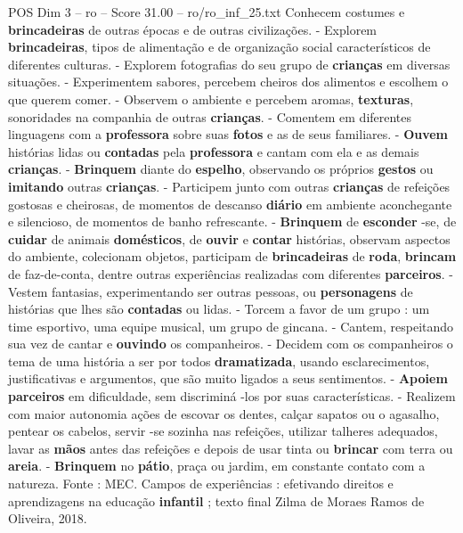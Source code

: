 \begin{textsample}{POS Dim 3 – ro – Score 31.00 – ro/ro\_inf\_25.txt}
Conhecem costumes e \textbf{brincadeiras} de outras épocas e de outras civilizações. - Explorem \textbf{brincadeiras}, tipos de alimentação e de organização social característicos de diferentes culturas. - Explorem fotografias do seu grupo de \textbf{crianças} em diversas situações. - Experimentem sabores, percebem cheiros dos alimentos e escolhem o que querem comer. - Observem o ambiente e percebem aromas, \textbf{texturas}, sonoridades na companhia de outras \textbf{crianças}. - Comentem em diferentes linguagens com a \textbf{professora} sobre suas \textbf{fotos} e as de seus familiares. - \textbf{Ouvem} histórias lidas ou \textbf{contadas} pela \textbf{professora} e cantam com ela e as demais \textbf{crianças}. - \textbf{Brinquem} diante do \textbf{espelho}, observando os próprios \textbf{gestos} ou \textbf{imitando} outras \textbf{crianças}. - Participem junto com outras \textbf{crianças} de refeições gostosas e cheirosas, de momentos de descanso \textbf{diário} em ambiente aconchegante e silencioso, de momentos de banho refrescante. - \textbf{Brinquem} de \textbf{esconder} -se, de \textbf{cuidar} de animais \textbf{domésticos}, de \textbf{ouvir} e \textbf{contar} histórias, observam aspectos do ambiente, colecionam objetos, participam de \textbf{brincadeiras} de \textbf{roda}, \textbf{brincam} de faz-de-conta, dentre outras experiências realizadas com diferentes \textbf{parceiros}. - Vestem fantasias, experimentando ser outras pessoas, ou \textbf{personagens} de histórias que lhes são \textbf{contadas} ou lidas. - Torcem a favor de um grupo : um time esportivo, uma equipe musical, um grupo de gincana. - Cantem, respeitando sua vez de cantar e \textbf{ouvindo} os companheiros. - Decidem com os companheiros o tema de uma história a ser por todos \textbf{dramatizada}, usando esclarecimentos, justificativas e argumentos, que são muito ligados a seus sentimentos. - \textbf{Apoiem} \textbf{parceiros} em dificuldade, sem discriminá -los por suas características. - Realizem com maior autonomia ações de escovar os dentes, calçar sapatos ou o agasalho, pentear os cabelos, servir -se sozinha nas refeições, utilizar talheres adequados, lavar as \textbf{mãos} antes das refeições e depois de usar tinta ou \textbf{brincar} com terra ou \textbf{areia}. - \textbf{Brinquem} no \textbf{pátio}, praça ou jardim, em constante contato com a natureza.
Fonte : MEC.
Campos de experiências : efetivando direitos e aprendizagens na educação \textbf{infantil} ; texto final Zilma de Moraes Ramos de Oliveira, 2018.

\end{textsample}
